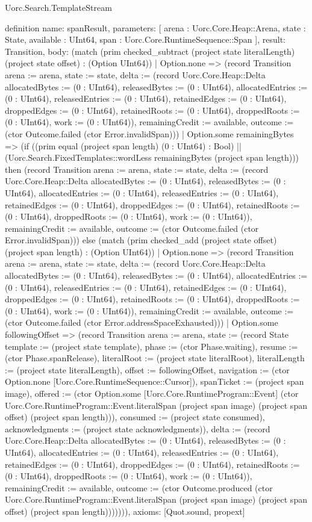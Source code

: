 \begin{lexlean}{Uorc.Search.TemplateStream}
\begin{semanticmodule}
definition{
  name: spanResult,
  parameters: [
    arena : Uorc.Core.Heap::Arena,
    state : State,
    available : UInt64,
    span : Uorc.Core.RuntimeSequence::Span
  ],
  result: Transition,
  body: (match (prim checked_subtract (project state literalLength) (project state offset) : (Option UInt64))
    | Option.none => (record Transition {arena := arena, state := state, delta := (record Uorc.Core.Heap::Delta {allocatedBytes := (0 : UInt64), releasedBytes := (0 : UInt64), allocatedEntries := (0 : UInt64), releasedEntries := (0 : UInt64), retainedEdges := (0 : UInt64), droppedEdges := (0 : UInt64), retainedRoots := (0 : UInt64), droppedRoots := (0 : UInt64), work := (0 : UInt64)}), remainingCredit := available, outcome := (ctor Outcome.failed (ctor Error.invalidSpan))})
    | Option.some remainingBytes => (if ((prim equal (project span length) (0 : UInt64) : Bool) || (Uorc.Search.FixedTemplates::wordLess remainingBytes (project span length))) then (record Transition {arena := arena, state := state, delta := (record Uorc.Core.Heap::Delta {allocatedBytes := (0 : UInt64), releasedBytes := (0 : UInt64), allocatedEntries := (0 : UInt64), releasedEntries := (0 : UInt64), retainedEdges := (0 : UInt64), droppedEdges := (0 : UInt64), retainedRoots := (0 : UInt64), droppedRoots := (0 : UInt64), work := (0 : UInt64)}), remainingCredit := available, outcome := (ctor Outcome.failed (ctor Error.invalidSpan))}) else (match (prim checked_add (project state offset) (project span length) : (Option UInt64))
      | Option.none => (record Transition {arena := arena, state := state, delta := (record Uorc.Core.Heap::Delta {allocatedBytes := (0 : UInt64), releasedBytes := (0 : UInt64), allocatedEntries := (0 : UInt64), releasedEntries := (0 : UInt64), retainedEdges := (0 : UInt64), droppedEdges := (0 : UInt64), retainedRoots := (0 : UInt64), droppedRoots := (0 : UInt64), work := (0 : UInt64)}), remainingCredit := available, outcome := (ctor Outcome.failed (ctor Error.addressSpaceExhausted))})
      | Option.some followingOffset => (record Transition {arena := arena, state := (record State {template := (project state template), phase := (ctor Phase.waiting), resume := (ctor Phase.spanRelease), literalRoot := (project state literalRoot), literalLength := (project state literalLength), offset := followingOffset, navigation := (ctor Option.none [Uorc.Core.RuntimeSequence::Cursor]), spanTicket := (project span image), offered := (ctor Option.some [Uorc.Core.RuntimeProgram::Event] (ctor Uorc.Core.RuntimeProgram::Event.literalSpan (project span image) (project span offset) (project span length))), consumed := (project state consumed), acknowledgments := (project state acknowledgments)}), delta := (record Uorc.Core.Heap::Delta {allocatedBytes := (0 : UInt64), releasedBytes := (0 : UInt64), allocatedEntries := (0 : UInt64), releasedEntries := (0 : UInt64), retainedEdges := (0 : UInt64), droppedEdges := (0 : UInt64), retainedRoots := (0 : UInt64), droppedRoots := (0 : UInt64), work := (0 : UInt64)}), remainingCredit := available, outcome := (ctor Outcome.produced (ctor Uorc.Core.RuntimeProgram::Event.literalSpan (project span image) (project span offset) (project span length)))})))),
  axioms: [Quot.sound, propext]
}


\end{semanticmodule}
\end{lexlean}
